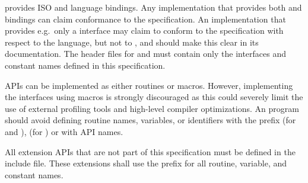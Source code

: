 \openshmem provides ISO \Cstd and \Fortran[90] language bindings.
Any implementation that provides both \Cstd and \Fortran bindings can claim
conformance to the specification. An implementation that provides e.g.\ only a
\Cstd interface may claim to conform to the \openshmem specification with
respect to the \Cstd language, but not to \Fortran, and should make this
clear in its documentation. The \openshmem header files for \Cstd and
\Fortran must contain only the interfaces and constant names defined in this
specification.

\openshmem \ac{API}s can be implemented as either routines or macros. However,
implementing the interfaces using macros is strongly discouraged as this could
severely limit the use of external profiling tools and high-level compiler
optimizations. An \openshmem program should avoid defining routine names,
variables, or identifiers with the prefix \shmemprefix (for \Cstd and
\Fortran), \shmemprefixC (for \Cstd) or with \openshmem \ac{API} names.

All \openshmem extension \ac{API}s that are not part of this specification must
be defined in the  include file. These extensions shall use the
 prefix for all routine, variable, and constant names.
